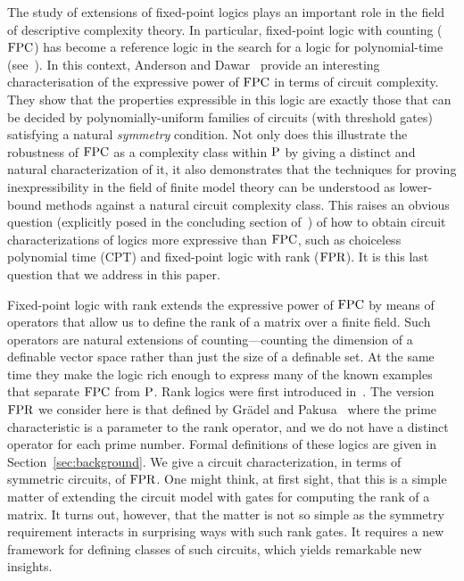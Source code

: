 \documentclass[../paper.tex]{subfiles}
\begin{document}
The study of extensions of fixed-point logics plays an important role
in the field of descriptive complexity theory.  In particular,
fixed-point logic with counting ($\text{\upshape FPC}$) has become a reference logic
in the search for a logic for polynomial-time
(see~\cite{Dawar-siglog}).  In this context, Anderson and
Dawar~\cite{AndersonD17} provide an interesting characterisation of
the expressive power of $\text{\upshape FPC}$ in terms of circuit complexity.  They
show that the properties expressible in this logic are exactly those
that can be decided by polynomially-uniform families of circuits (with
threshold gates) satisfying a natural \emph{symmetry} condition.  Not
only does this illustrate the robustness of $\text{\upshape FPC}$ as a complexity
class within $\mathrm{P}$ by giving a distinct and natural characterization
of it, it also demonstrates that the techniques for proving
inexpressibility in the field of finite model theory can be understood
as lower-bound methods against a natural circuit complexity class.
This raises an obvious question (explicitly posed in the concluding
section of~\cite{AndersonD17}) of how to obtain circuit
characterizations of logics more expressive than $\text{\upshape FPC}$, such as
choiceless polynomial time (CPT) and fixed-point logic with rank
($\text{\upshape FPR}$).  It is this last question that we address in this paper.

Fixed-point logic with rank extends the expressive power of $\text{\upshape FPC}$ by
means of operators that allow us to define the rank of a matrix over a
finite field.  Such operators are natural extensions of
counting---counting the dimension of a definable vector space
rather than just the size of a definable set.  At the same time they
make the logic rich enough to express many of the known examples that
separate $\text{\upshape FPC}$ from $\mathrm{P}$.  Rank logics were first introduced
in~\cite{Dawar09logicswith}.  The version $\text{\upshape FPR}$ we consider here is that
defined by Gr\"adel and Pakusa~\cite{GradelP15a} where the prime
characteristic is a parameter to the rank operator, and we do not have
a distinct operator for each prime number.  Formal definitions of
these logics are given in Section~\ref{sec:background}.  We give a circuit
characterization, in terms of symmetric circuits, of $\text{\upshape FPR}$.  One
might think, at first sight, that this is a simple matter of extending
the circuit model with gates for computing the rank of a matrix.
It turns out, however, that the matter is not so simple as the
symmetry requirement interacts in surprising ways with such rank
gates.  It requires a new framework for defining classes of such
circuits, which yields remarkable new insights. 
\end{document}
